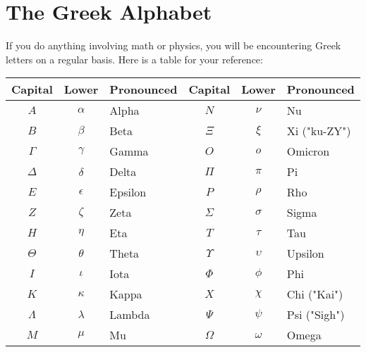 \chapter{The Greek Alphabet}

If you do anything involving math or physics, you will be encountering Greek letters on a regular basis. Here is a table for your reference:

\begin{tabular}{c c  l | c c l}
Capital & Lower & Pronounced & Capital & Lower & Pronounced\\
\hline
$A$ & $\alpha$ & Alpha & $N$ & $\nu$ & Nu\\
$B$ & $\beta$ & Beta & $\Xi$ & $\xi$ & Xi ("ku-ZY") \\
$\Gamma$ & $\gamma$ & Gamma & $O$ & $o$ & Omicron\\
$\Delta$ & $\delta$ & Delta & $\Pi$ & $\pi$ & Pi\\
$E$ & $\epsilon$ & Epsilon & $P$ & $\rho$ & Rho\\
$Z$ & $\zeta$ & Zeta & $\Sigma$ & $\sigma$ & Sigma\\
$H$ & $\eta$ & Eta & $T$ & $\tau$ & Tau\\
$\Theta$ & $\theta$ & Theta & $\Upsilon$ & $\upsilon$ & Upsilon\\
$I$ & $\iota$ & Iota & $\Phi$ & $\phi$ & Phi\\
$K$ & $\kappa$ & Kappa & $X$ & $\chi$ & Chi ("Kai")\\
$\Lambda$ & $\lambda$ & Lambda & $\Psi$ & $\psi$ & Psi ("Sigh")\\
$M$ & $\mu$ & Mu & $\Omega$ & $\omega$ & Omega
\end{tabular}
